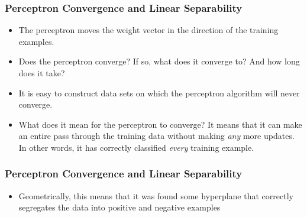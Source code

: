 \documentclass[trans]{beamer}
\begin{document}



\begin{frame}
  \frametitle{Perceptron Convergence and Linear Separability}
\begin{itemize}
\item
The perceptron moves the weight vector in the direction of the training
examples.  
\item Does the
perceptron converge?  If so, what does it converge to?  And how long
does it take?
\item
It is easy to construct data sets on which the perceptron algorithm
will never converge. 
%
%
%
\item What does it mean for the perceptron to converge?  It means that it
can make an entire pass through the training data without making
\emph{any} more updates.  In other words, it has correctly classified
\emph{every} training example.
\end{itemize}
\end{frame}
\begin{frame}
  \frametitle{Perceptron Convergence and Linear Separability}
\begin{itemize}
\item
  Geometrically, this means that it was
found some hyperplane that correctly segregates the data into positive
and negative examples
\end{itemize}
\end{frame}
\end{document}
